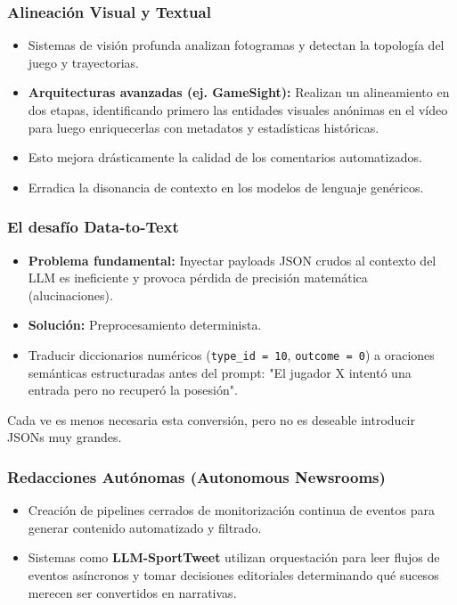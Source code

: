 \documentclass[aspectratio=169]{beamer}
\begin{document}
\begin{frame}\frametitle{Alineación Visual y Textual}
\begin{itemize}
    \item Sistemas de visión profunda analizan fotogramas y detectan la topología del juego y trayectorias.
    \item \textbf{Arquitecturas avanzadas (ej. GameSight):} Realizan un alineamiento en dos etapas, identificando primero las entidades visuales anónimas en el vídeo para luego enriquecerlas con metadatos y estadísticas históricas.
    \item Esto mejora drásticamente la calidad de los comentarios automatizados.
    \item Erradica la disonancia de contexto en los modelos de lenguaje genéricos.
\end{itemize}
\end{frame}

\begin{frame}\frametitle{El desafío Data-to-Text}
\begin{itemize}
    \item \textbf{Problema fundamental:} Inyectar payloads JSON crudos al contexto del LLM es ineficiente y provoca pérdida de precisión matemática (alucinaciones).
    \item \textbf{Solución:} Preprocesamiento determinista.
    \item Traducir diccionarios numéricos (\texttt{type\_id = 10}, \texttt{outcome = 0}) a oraciones semánticas estructuradas antes del prompt: "El jugador X intentó una entrada pero no recuperó la posesión".
\end{itemize}
Cada ve es menos necesaria esta conversión, pero no es deseable introducir JSONs muy grandes.
\end{frame}

\begin{frame}\frametitle{Redacciones Autónomas (Autonomous Newsrooms)}
\begin{itemize}
    \item Creación de pipelines cerrados de monitorización continua de eventos para generar contenido automatizado y filtrado.
    \item Sistemas como \textbf{LLM-SportTweet} utilizan orquestación para leer flujos de eventos asíncronos y tomar decisiones editoriales determinando qué sucesos merecen ser convertidos en narrativas.
\end{itemize}
\end{frame}
\end{document}
